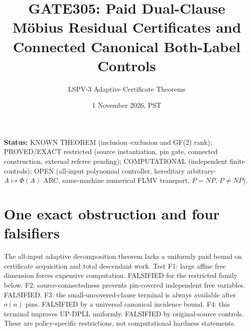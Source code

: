 \documentclass[11pt]{article}
\title{GATE305: Paid Dual-Clause M\"obius Residual Certificates and Connected Canonical Both-Label Controls}
\author{LSPV-3 Adaptive Certificate Theorems}
\date{1 November 2026, PST}
\begin{document}
\maketitle
\noindent\textbf{Status:} KNOWN THEOREM (inclusion--exclusion and GF(2) rank); PROVED/EXACT restricted (source instantiation, pin gate, connected construction, external referee pending); COMPUTATIONAL (independent finite controls); OPEN (all-input polynomial controller, hereditary arbitrary-$A\mapsto\Phi(A)$ ARC, same-machine numerical FLMV transport, $P=NP$, $P\ne NP$).

\section{One exact obstruction and four falsifiers}
The all-input adaptive decomposition theorem lacks a uniformly paid bound on certificate acquisition and total descendant work. Test F1: large affine free dimension forces expensive computation. FALSIFIED for the restricted family below. F2: source-connectedness prevents pin-covered independent free variables. FALSIFIED. F3: the small-uncovered-clause terminal is always available after $o(n)$ pins. FALSIFIED by a universal canonical incidence bound. F4: this terminal improves UP-DPLL uniformly. FALSIFIED by original-source controls. These are policy-specific restrictions, not computational hardness statements.
\end{document}
